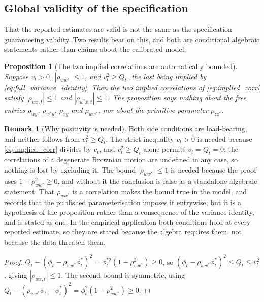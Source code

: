 \documentclass[11pt]{article}
\newtheorem{proposition}[proposition]{Proposition}
\theoremstyle{definition}
\newtheorem{remark}[remark]{Remark}
\begin{document}
\subsection{Global validity of the specification}\label{app:psd_global}

That the reported estimates are valid is not the same as the specification guaranteeing validity. Two results bear on this, and both are conditional algebraic statements rather than claims about the calibrated model.

\begin{proposition}[The two implied correlations are automatically bounded]\label{prop:entrywise}
Suppose $v_t>0$, $|\rho_{ww^*}|\le1$, and $v_t^2\ge Q_t$, the last being implied by \eqref{eq:full_variance_identity}. Then the two \emph{implied} correlations of \eqref{eq:implied_corr} satisfy $|\rho_{wx,t}|\le1$ and $|\rho_{w^*x,t}|\le1$. The proposition says nothing about the free entries $\rho_{wy}$, $\rho_{w^*y}$, $\rho_{xy}$ and $\rho_{ww^*}$, nor about the primitive parameter $\rho_{zz^*}$.
\end{proposition}

\begin{remark}[Why positivity is needed]\label{rem:vol_positive}
Both side conditions are load-bearing, and neither follows from $v_t^2\ge Q_t$. The strict inequality $v_t>0$ is needed because \eqref{eq:implied_corr} divides by $v_t$, and $v_t^2\ge Q_t$ alone permits $v_t=Q_t=0$; the correlations of a degenerate Brownian motion are undefined in any case, so nothing is lost by excluding it. The bound $|\rho_{ww^*}|\le1$ is needed because the proof uses $1-\rho_{ww^*}^2\ge0$, and without it the conclusion is false as a standalone algebraic statement. That $\rho_{ww^*}$ is a correlation makes the bound true in the model, and  records that the published parameterisation imposes it entrywise; but it is a hypothesis of the proposition rather than a consequence of the variance identity, and is stated as one. In the empirical application both conditions hold at every reported estimate, so they are stated because the algebra requires them, not because the data threaten them.
\end{remark}

\begin{proof}
$Q_t-(\phi_t-\rho_{ww^*}\phi_t^*)^2=\phi_t^{*2}(1-\rho_{ww^*}^2)\ge0$, so $(\phi_t-\rho_{ww^*}\phi_t^*)^2\le Q_t\le v_t^2$, giving $|\rho_{wx,t}|\le1$. The second bound is symmetric, using $Q_t-(\rho_{ww^*}\phi_t-\phi_t^*)^2=\phi_t^2(1-\rho_{ww^*}^2)\ge0$.
\end{proof}
\end{document}

